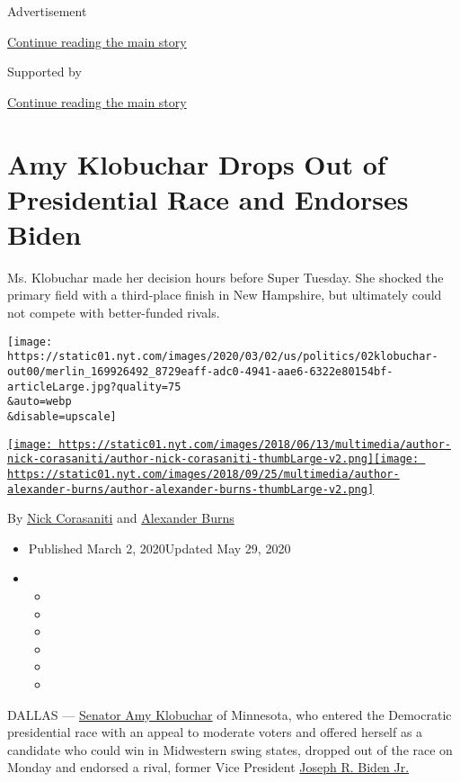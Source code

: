 Advertisement

\protect\hyperlink{after-top}{Continue reading the main story}

Supported by

\protect\hyperlink{after-sponsor}{Continue reading the main story}

\hypertarget{amy-klobuchar-drops-out-of-presidential-race-and-endorses-biden}{%
\section{Amy Klobuchar Drops Out of Presidential Race and Endorses
Biden}\label{amy-klobuchar-drops-out-of-presidential-race-and-endorses-biden}}

Ms. Klobuchar made her decision hours before Super Tuesday. She shocked
the primary field with a third-place finish in New Hampshire, but
ultimately could not compete with better-funded rivals.

\texttt{[image: https://static01.nyt.com/images/2020/03/02/us/politics/02klobuchar-out00/merlin\_169926492\_8729eaff-adc0-4941-aae6-6322e80154bf-articleLarge.jpg?quality=75\\\&auto=webp\\\&disable=upscale]}

\href{https://www.nytimes.com/by/nick-corasaniti}{\texttt{[image: https://static01.nyt.com/images/2018/06/13/multimedia/author-nick-corasaniti/author-nick-corasaniti-thumbLarge-v2.png]}}\href{https://www.nytimes.com/by/alexander-burns}{\texttt{[image: https://static01.nyt.com/images/2018/09/25/multimedia/author-alexander-burns/author-alexander-burns-thumbLarge-v2.png]}}

By \href{https://www.nytimes.com/by/nick-corasaniti}{Nick Corasaniti}
and \href{https://www.nytimes.com/by/alexander-burns}{Alexander Burns}

\begin{itemize}
\item
  Published March 2, 2020Updated May 29, 2020
\item
  \begin{itemize}
  \item
  \item
  \item
  \item
  \item
  \item
  \end{itemize}
\end{itemize}

DALLAS ---
\href{https://www.nytimes.com/2020/05/29/us/politics/klobuchar-minneapolis-george-floyd.html}{Senator
Amy Klobuchar} of Minnesota, who entered the Democratic presidential
race with an appeal to moderate voters and offered herself as a
candidate who could win in Midwestern swing states, dropped out of the
race on Monday and endorsed a rival, former Vice President
\href{https://www.nytimes.com/interactive/2020/us/elections/joe-biden.html}{Joseph
R. Biden Jr.}


